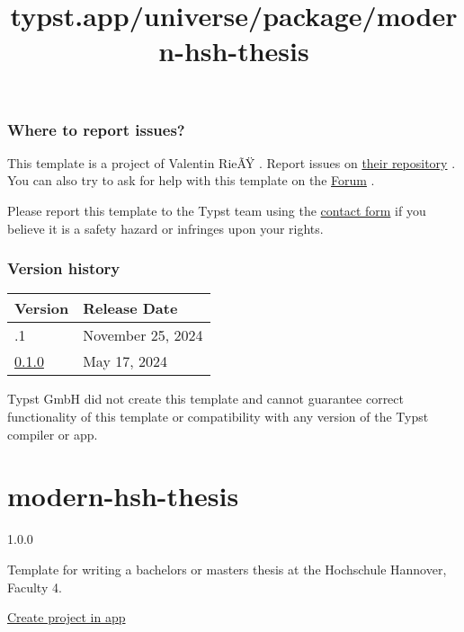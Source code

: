 \subsubsection{Where to report issues?}\label{where-to-report-issues}

This template is a project of Valentin RieÃŸ . Report issues on
\href{https://github.com/v411e/optimal-ovgu-thesis}{their repository} .
You can also try to ask for help with this template on the
\href{https://forum.typst.app}{Forum} .

Please report this template to the Typst team using the
\href{https://typst.app/contact}{contact form} if you believe it is a
safety hazard or infringes upon your rights.

\label{versions}
\subsubsection{Version history}\label{version-history}

\begin{longtable}[]{@{}ll@{}}
\toprule\noalign{}
Version & Release Date \\
\midrule\noalign{}
\endhead
\bottomrule\noalign{}
\endlastfoot
0.1.1 & November 25, 2024 \\
\href{https://typst.app/universe/package/optimal-ovgu-thesis/0.1.0/}{0.1.0}
& May 17, 2024 \\
\end{longtable}

Typst GmbH did not create this template and cannot guarantee correct
functionality of this template or compatibility with any version of the
Typst compiler or app.


\title{typst.app/universe/package/modern-hsh-thesis}

\label{banner}
\label{template-thumbnail}

\section{modern-hsh-thesis}\label{modern-hsh-thesis}

{ 1.0.0 }

Template for writing a bachelors or masters thesis at the Hochschule
Hannover, Faculty 4.

\href{/app?template=modern-hsh-thesis&version=1.0.0}{Create project in
app}

